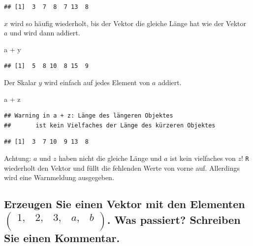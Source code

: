 \documentclass[12pt,a4paper]{article}
\newenvironment{Shaded}{\begin{snugshade}}{\end{snugshade}}
\newcommand{\NormalTok}[1]{#1}
\newcommand{\SpecialCharTok}[1]{\textcolor[rgb]{0.00,0.00,0.00}{#1}}
\begin{document}
\begin{verbatim}
## [1]  3  7  8  7 13  8
\end{verbatim}

\(x\) wird so häufig wiederholt, bis der Vektor die gleiche Länge hat
wie der Vektor \(a\) und wird dann addiert.

\begin{Shaded}
\begin{Highlighting}[]
\NormalTok{    a }\SpecialCharTok{+}\NormalTok{ y}
\end{Highlighting}
\end{Shaded}

\begin{verbatim}
## [1]  5  8 10  8 15  9
\end{verbatim}

Der Skalar \(y\) wird einfach auf jedes Element von \(a\) addiert.

\begin{Shaded}
\begin{Highlighting}[]
\NormalTok{    a }\SpecialCharTok{+}\NormalTok{ z}
\end{Highlighting}
\end{Shaded}

\begin{verbatim}
## Warning in a + z: Länge des längeren Objektes
##       ist kein Vielfaches der Länge des kürzeren Objektes
\end{verbatim}

\begin{verbatim}
## [1]  3  7 10  9 13  8
\end{verbatim}

Achtung: \(a\) und \(z\) haben nicht die gleiche Länge und \(a\) ist
kein vielfaches von \(z\)! \texttt{R} wiederholt den Vektor und füllt
die fehlenden Werte von vorne auf. Allerdings wird eine Warnmeldung
ausgegeben.

\vspace{0.5cm}

\hypertarget{erzeugen-sie-einen-vektor-mit-den-elementen-beginpmatrix-1-2-3-a-b-endpmatrix.-was-passiert-schreiben-sie-einen-kommentar.}{%
\subsection{\texorpdfstring{Erzeugen Sie einen Vektor mit den Elementen
\(\begin{pmatrix} 1, & 2, & 3, & a, & b \\ \end{pmatrix}\). Was
passiert? Schreiben Sie einen
Kommentar.}{Erzeugen Sie einen Vektor mit den Elementen \textbackslash begin\{pmatrix\} 1, \& 2, \& 3, \& a, \& b \textbackslash\textbackslash{} \textbackslash end\{pmatrix\}. Was passiert? Schreiben Sie einen Kommentar.}}\label{erzeugen-sie-einen-vektor-mit-den-elementen-beginpmatrix-1-2-3-a-b-endpmatrix.-was-passiert-schreiben-sie-einen-kommentar.}}
\end{document}
